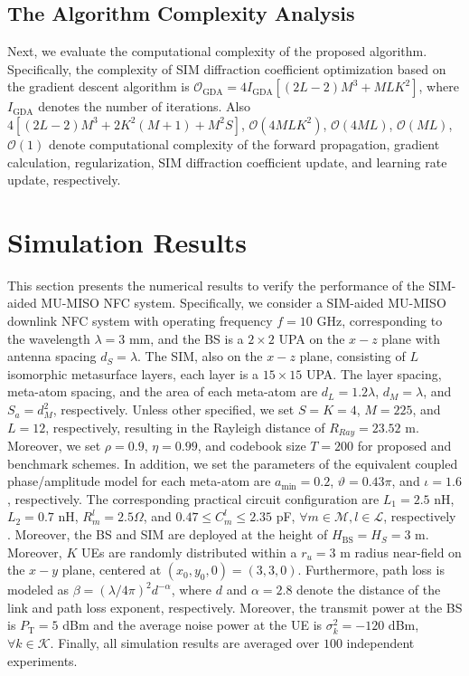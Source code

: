 \documentclass[conference]{IEEEtran}
\theoremstyle{remark}
\begin{document}
\subsection{The Algorithm Complexity Analysis}
Next, we evaluate the computational complexity of the proposed algorithm. Specifically,
the complexity of SIM diffraction coefficient optimization based on the gradient descent algorithm is $\mathcal{O}_\text{GDA}=4I_\text{GDA}\left[ (2L-2)M^3 + MLK^2\right]$, where $I_\text{GDA}$ denotes the number of iterations. Also $4\left[ (2L-2)M^3+2K^2(M+1)+M^2S\right]$, $\mathcal{O}\left( 4MLK^2\right)$, $\mathcal{O}\left( 4ML\right)$, $\mathcal{O}\left( ML\right)$, $\mathcal{O}\left( 1\right)$ denote computational complexity of the forward propagation, gradient calculation, regularization, SIM diffraction coefficient update, and learning rate update, respectively.

\section{Simulation Results}\label{Sec_IV}
This section presents the numerical results to verify the performance of the SIM-aided MU-MISO NFC system.
Specifically, we consider a SIM-aided MU-MISO downlink NFC system with operating frequency $f=10$ GHz, corresponding to the wavelength $\lambda=3$ mm, and the BS is a $2\times 2$ UPA on the $x-z$ plane with antenna spacing $d_{S}=\lambda$. 
The SIM, also on the $x-z$ plane, consisting of $L$ isomorphic metasurface layers, each layer is a $15\times15$ UPA. The layer spacing, meta-atom spacing, and the area of each meta-atom are $d_{L}=1.2\lambda$, $d_{M}=\lambda$, and $S_{a}=d_{M}^2$, respectively.
Unless other specified, we set $S=K=4$, $M=225$, and $L=12$, respectively, 
resulting in the Rayleigh distance of $R_{Ray}=23.52$ m.
Moreover, we set $\rho=0.9$, $\eta=0.99$, and codebook size $T=200$ for proposed and benchmark schemes.
In addition, we set the parameters of the equivalent coupled phase/amplitude model for each meta-atom are $a_\text{min}=0.2$, $\vartheta=0.43 \pi$, and $\iota=1.6$, respectively. The corresponding practical circuit configuration are $L_1=2.5$ nH, $L_2=0.7$ nH, $R_{m}^{l}=2.5 \Omega$, and $0.47 \le C_{m}^{l} \le 2.35$ pF, $\forall m\in\mathcal{M}, l\in\mathcal{L}$, respectively \cite{Ref_wu_Z0}.
Moreover, the BS and SIM are deployed at the height of $H_\text{BS}=H_{S}=3$ m. Moreover, $K$ UEs are randomly distributed within a $r_{u}=3$ m radius near-field on the $x-y$ plane, centered at $(x_{0},y_{0},0)=(3,3,0)$.
Furthermore, path loss is modeled as $\beta = (\lambda/{4\pi})^2 d^{-\alpha} $, where $d$ and $\alpha=2.8$ denote the distance of the link and path loss exponent, respectively. 
Moreover, the transmit power at the BS is ${P_\text{T}} = 5$ dBm and the average noise power at the UE is ${\sigma^2_k} = - 120$ dBm, $\forall k \in \mathcal{K}$. Finally, all simulation results are averaged over $100$ independent experiments.
\end{document}
